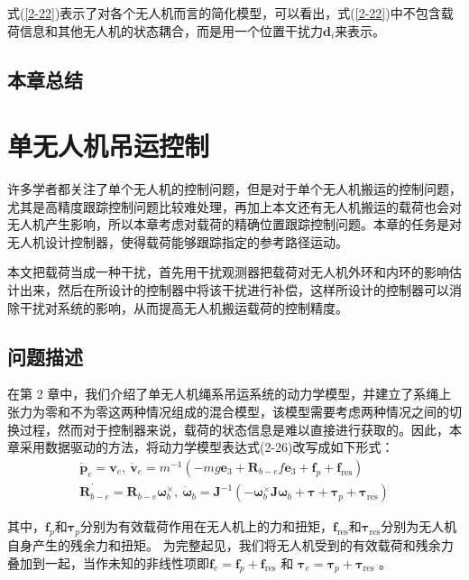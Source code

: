 \documentclass[lang=chs, degree=master, blindreview=false, winfonts=true]{yanputhesis}
\begin{document}
式(\ref{2-22})表示了对各个无人机而言的简化模型，可以看出，式(\ref{2-22})中不包含载荷信息和其他无人机的状态耦合，而是用一个位置干扰力$\boldsymbol{d}_{i}$来表示。

\section{本章总结}

\cleardoublepage

\chapter{单无人机吊运控制}

许多学者都关注了单个无人机的控制问题，但是对于单个无人机搬运的控制问题，尤其是高精度跟踪控制问题比较难处理，再加上本文还有无人机搬运的载荷也会对无人机产生影响，所以本章考虑对载荷的精确位置跟踪控制问题。本章的任务是对无人机设计控制器，使得载荷能够跟踪指定的参考路径运动。 

本文把载荷当成一种干扰，首先用干扰观测器把载荷对无人机外环和内环的影响估计出来，然后在所设计的控制器中将该干扰进行补偿，这样所设计的控制器可以消除干扰对系统的影响，从而提高无人机搬运载荷的控制精度。

\section{问题描述}
在第 2 章中，我们介绍了单无人机绳系吊运系统的动力学模型，并建立了系绳上张力为零和不为零这两种情况组成的混合模型，该模型需要考虑两种情况之间的切换过程，然而对于控制器来说，载荷的状态信息是难以直接进行获取的。因此，本章采用数据驱动的方法，将动力学模型表达式(2-26)改写成如下形式：
\begin{equation}
	\begin{aligned}
		\dot{\boldsymbol{p}}_e = \boldsymbol{v}_e, \
		\dot{\boldsymbol{v}}_e = m^{-1}\left(-mg\bm{e}_3+\boldsymbol{R}_{b-e}f\bm{e}_3+\bm{f}_p+\bm{f}_{\text{res}}\right) \\
		\dot{\bm{R}_{b-e}} = \bm{R}_{b-e} \bm{\omega}_b^{\times}, \
		\dot{\boldsymbol{\omega}}_b = \boldsymbol{J}^{-1}\left(-\bm{\omega}_b^{\times}\bm{J} \bm{\omega}_b+\boldsymbol{\tau}+ \bm{\tau}_p+ \bm{\tau}_{\text{res}}\right)
	\end{aligned}\label{3-1}
\end{equation}



其中，$\bm{f}_p$和$\bm{\tau}_p$分别为有效载荷作用在无人机上的力和扭矩，$\bm{f}_\text{res}$和$\bm{\tau}_\text{res}$分别为无人机自身产生的残余力和扭矩。
为完整起见，我们将无人机受到的有效载荷和残余力叠加到一起，当作未知的非线性项即$\bm f_e = \bm f_p+ \bm f_{\text{res}}$ 和 $\bm \tau_e = \bm \tau_p+\bm \tau_{\text{res}}$ 。
	
\end{document}
